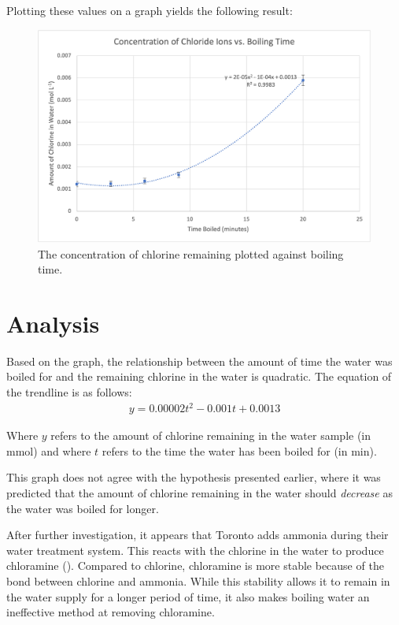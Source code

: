 \documentclass[11pt]{article}
\begin{document}
\newpage

Plotting these values on a graph yields the following result:

\begin{figure}[H]
	\centering
	\caption{The concentration of chlorine remaining plotted against boiling time.}
	\includegraphics{assets/concentration-vs-boiling-time.png}
\end{figure}

\section{Analysis}

Based on the graph, the relationship between the amount of time the water was boiled for and the remaining chlorine in the water is quadratic. The equation of the trendline is as follows:
%
\begin{align*}
	y = 0.00002t^2 - 0.001t + 0.0013
\end{align*}

Where $y$ refers to the amount of chlorine remaining in the water sample (in \si{\mmol}) and where $t$ refers to the time the water has been boiled for (in \si{\minute}).

This graph does not agree with the hypothesis presented earlier, where it was predicted that the amount of chlorine remaining in the water should \textit{decrease} as the water was boiled for longer.

After further investigation, it appears that Toronto adds ammonia during their water treatment system. This reacts with the chlorine in the water to produce chloramine (). Compared to chlorine, chloramine is more stable because of the bond between chlorine and ammonia. While this stability allows it to remain in the water supply for a longer period of time, it also makes boiling water an ineffective method at removing chloramine.
\end{document}
